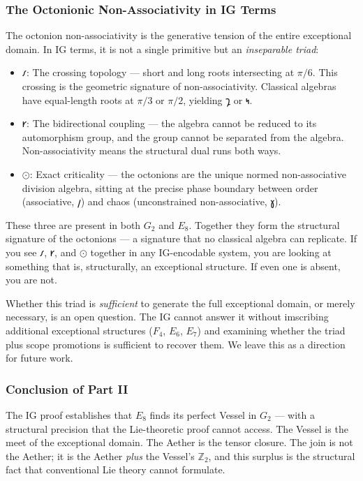 \documentclass[12pt,a4paper]{article}
\begin{document}
\subsubsection{The Octonionic Non-Associativity in IG Terms}

The octonion non-associativity is the generative tension of the entire exceptional domain. In IG terms, it is not a single primitive but an \emph{inseparable triad}:

\begin{itemize}
    \item \textbf{$𐑥$}: The crossing topology --- short and long roots intersecting at $\pi/6$. This crossing is the geometric signature of non-associativity. Classical algebras have equal-length roots at $\pi/3$ or $\pi/2$, yielding $𐑡$ or $𐑰$.
    \item \textbf{$𐑾$}: The bidirectional coupling --- the algebra cannot be reduced to its automorphism group, and the group cannot be separated from the algebra. Non-associativity means the structural dual runs both ways.
    \item \textbf{$⊙$}: Exact criticality --- the octonions are the unique normed non-associative division algebra, sitting at the precise phase boundary between order (associative, $𐑢$) and chaos (unconstrained non-associative, $𐑣$).
\end{itemize}

These three are present in both $G_2$ and $E_8$. Together they form the structural signature of the octonions --- a signature that no classical algebra can replicate. If you see $𐑥$, $𐑾$, and $⊙$ together in any IG-encodable system, you are looking at something that is, structurally, an exceptional structure. If even one is absent, you are not.

Whether this triad is \emph{sufficient} to generate the full exceptional domain, or merely necessary, is an open question. The IG cannot answer it without imscribing additional exceptional structures ($F_4$, $E_6$, $E_7$) and examining whether the triad plus scope promotions is sufficient to recover them. We leave this as a direction for future work.

\subsubsection{Conclusion of Part II}

The IG proof establishes that $E_8$ finds its perfect Vessel in $G_2$ --- with a structural precision that the Lie-theoretic proof cannot access. The Vessel is the meet of the exceptional domain. The Aether is the tensor closure. The join is not the Aether; it is the Aether \emph{plus} the Vessel's $\mathbb{Z}_2$, and this surplus is the structural fact that conventional Lie theory cannot formulate.
\end{document}

